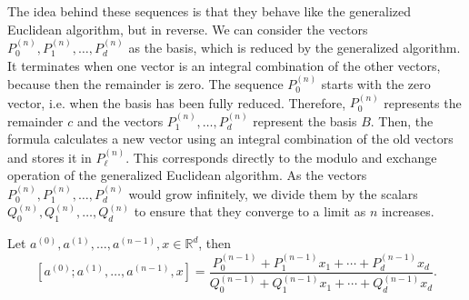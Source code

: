 The idea behind these sequences is that they behave like the generalized
Euclidean algorithm, but in reverse.
We can consider the vectors $P_0^{(n)}, P_1^{(n)}, …, P_d^{(n)}$ as the basis,
which is reduced by the generalized algorithm.
It terminates when one vector is an integral combination
of the other vectors, because then the remainder is zero.
The sequence $P_0^{(n)}$ starts with the zero vector,
i.e. when the basis has been fully reduced.
Therefore, $P_0^{(n)}$ represents the remainder $c$ and the vectors $P_1^{(n)},
…, P_d^{(n)}$ represent the basis $B$.
Then, the formula calculates a new vector using an integral combination of the
old vectors and stores it in $P_ℓ^{(n)}$.
This corresponds directly to the modulo and exchange operation of the
generalized Euclidean algorithm.
As the vectors $P_0^{(n)}, P_1^{(n)}, …, P_d^{(n)}$ would grow infinitely, we
divide them by the scalars $Q_0^{(n)}, Q_1^{(n)}, …, Q_d^{(n)}$ to ensure that
they converge to a limit as $n$ increases.

\begin{lemma}
  \label{lem:mcf-wallis}
  Let $a^{(0)}, a^{(1)}, …, a^{(n-1)}, x ∈ ℝ^d$, then
  \[
    [a^{(0)}; a^{(1)}, …, a^{(n-1)}, x]
    = \frac{P_0^{(n-1)} + P_1^{(n-1)} x_1 + ⋯ + P_d^{(n-1)} x_d}{Q_0^{(n-1)} + Q_1^{(n-1)} x_1 + ⋯ + Q_d^{(n-1)} x_d}.
  \]
\end{lemma}

